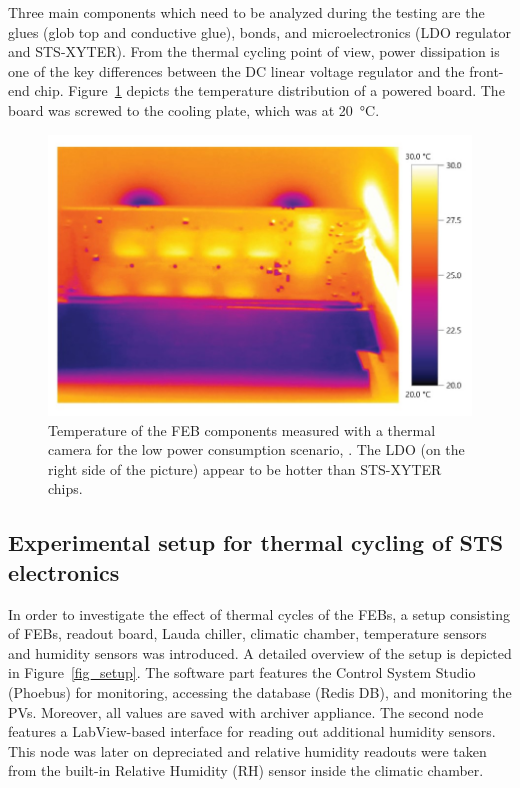 Three main components which need to be analyzed during the testing are the glues (glob top and conductive glue), bonds, and microelectronics (\gls{LDO} regulator and STS-XYTER). From the thermal cycling point of view, power dissipation is one of the key differences between the DC linear voltage regulator and the front-end chip. Figure~\ref{fig_temperatures_camera} depicts the temperature distribution of a powered board. The board was screwed to the cooling plate, which was at \SI{20}{\celsius}.

\begin{figure}[!h]
\centering
\includegraphics[width=0.6\columnwidth]{Chapter4/images/feb_thermal.jpg}
\caption{Temperature of the \gls{FEB} components measured with a thermal camera for the low power consumption scenario, \cite{leo_electronics}. The \gls{LDO} (on the right side of the picture) appear to be hotter than STS-XYTER chips.}
\label{fig_temperatures_camera}
\end{figure}




\subsection{Experimental setup for thermal cycling of STS electronics}
\label{cycling_setup}
In order to investigate the effect of thermal cycles of the FEBs, a setup consisting of FEBs, readout board, Lauda chiller, climatic chamber, temperature sensors and humidity sensors was introduced.
A detailed overview of the setup is depicted in Figure~\ref{fig_setup}. The software part features the Control System Studio (Phoebus) for monitoring, accessing the database (Redis DB), and monitoring the \gls{PV}s. Moreover, all values are saved with archiver appliance. The second node features a LabView-based interface for reading out additional humidity sensors. This node was later on depreciated and relative humidity readouts were taken from the built-in Relative Humidity (\gls{RH}) sensor inside the climatic chamber.

